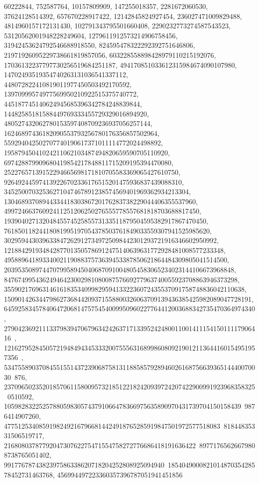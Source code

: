 {{{   60222844, 752587764, 10157809909, 147255018357, 2281672060530, 
   37624128514392, 657670228917422, 12142845824927454, 236027471009829488, 
   4814960157172131430, 102791343795501660408, 2290232773274587543523, 
   53120562001948228249604, 1279611912573214906758456, 
   31942453624792546688918550, 824595478322292392751646806, 
   21971926095229738661819857056, 603228558898428979110215192076, 
   17036132237797730256519684251187, 494170851033612315984674090107980, 
   14702493519354740263131036541337112, 448072822410819011977450503492170592, 
   13970999574977569950210922515375740772, 
   445187745140624945685396342784248839844, 
   14482585181588449769333455729329016894920, 
   480527432062780153597408709236937056257144, 
   16246897436182090553793256780176356857502964, 
   559294042502707740190617371011114772024498892, 
   19587945041024211062103487494820659590705110920, 
   697428879909680419854217848811715209195394470080, 
   25227657139152294665698171810705583369065427610750, 
   926492445974139226702336176515201475936837439088310, 
   34525007032536271047467891238574569401969362934213304, 
   1304689370894433441830386720176283738229044406355537960, 
   49972466376092411251206250276555778557681818703688817450, 
   1939040271320484557452585573133511879504595382917867470450, 
   76185011824418081995197054378503761849033559307941525985620, 
   3029594430396338472629127349725098442301293721916346602950992, 
   121884291934842877013505786912475140639631772928481008577233348, 
   4958896418933400211908837573639453387850621864484309805041514500, 
   203953508974470799589450406870910048054583065234023144106673968848, 
   8476749954362494642300298108008757669277963740055923708863946373298, 
   355902176963146161835340998295941332236072435537091758748836042110638, 
   15090142634479862736844209371558800326063709139436385425982089047728191, 
   645925834578406472068147575454009950960227764412003688342735470364974340, 
   27904236921113379839470679634242637171339524248001100141115415011117906416\
, 
   1216279528450572194849434533320075556316899860809219012113644160154951957356\
, 
   53475589037084551551437239068758131188585792894602616875663936514440070030\
876, 237096502352018570611580095732185122182420939724207422900991923968358325\
0510592, 10598283225257880598305743791066478366975635890970431739704150158439\
9876414907260, 47751253408591982492167966814424918765285919847501972577518083\
81844835331506519717, 2168080378779204730762275471554758272776686418191636422\
89771765626679808738765051402, 9917767874382397586338620718204252808925094940\
185404900082101487035428578452731463768, 456994497223360357396787051941451856\
}}}
